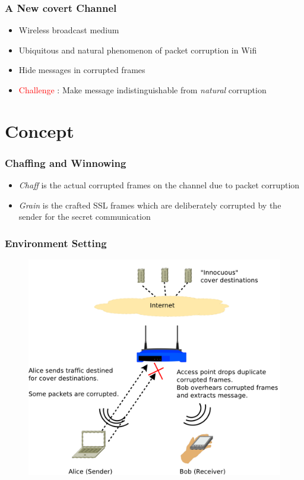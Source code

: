\documentclass{beamer}
\begin{document}
\begin{frame}
  \frametitle{A New covert Channel}
    \begin{itemize}
    \item Wireless broadcast medium
    \item Ubiquitous and natural phenomenon of packet corruption in Wifi 
    \item Hide messages in corrupted frames
    \item \textcolor{red}{Challenge} : Make message indistinguishable from
      \textit{natural} corruption
    \end{itemize}
\end{frame}

\section{Concept}
\begin{frame}
  \frametitle{Chaffing and Winnowing}
    \begin{itemize}
    \item \textit{Chaff} is the actual corrupted frames on the channel
      due to packet corruption\footnotemark
    \item \textit{Grain} is the crafted SSL frames which are
      deliberately corrupted by the sender for the secret
      communication
    \end{itemize}
\end{frame}

\begin{frame}
  \frametitle{Environment Setting}
  \begin{figure}
  \centering
  \includegraphics[width=.8\textwidth]{images/setting}
  \end{figure}
\end{frame}
\end{document}
